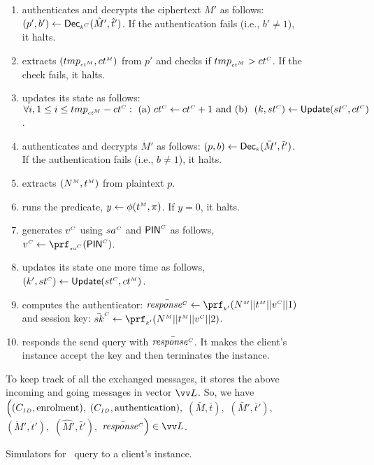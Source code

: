 \begin{figure}[H]
\begin{center}
\begin{tcolorbox}[enhanced,width=4.7in,left=0.1cm, 
    drop fuzzy shadow southwest,
    colframe=black,colback=white]
{{\begin{itemize}[leftmargin=.4cm]
\begin{itemize}[leftmargin=.4cm]
\begin{enumerate}
 \item   authenticates and decrypts the ciphertext $\hat M'$ as follows: $(p', b') \gets \mathsf{Dec}_{\scriptscriptstyle k^{\scriptscriptstyle C}}(\hat M', \hat t')$. If the authentication fails (i.e., $b'\neq 1$), it halts.  
  \item extracts $({tmp}_{\scriptscriptstyle{ct}^{\scriptscriptstyle M}}, {ct}^{\scriptscriptstyle M})$ from $p'$ and checks if ${tmp}_{\scriptscriptstyle{ct}^{\scriptscriptstyle M}} > {ct}^{\scriptscriptstyle C} $. If the check fails, it halts. 
 \item updates its state as follows: $\forall i, 1\leq i\leq {tmp}_{\scriptscriptstyle{ct}^{\scriptscriptstyle M}}- {ct}^{\scriptscriptstyle C}: \text{\ (a)\ } {ct}^{\scriptscriptstyle C} \gets {ct}^{\scriptscriptstyle C} + 1\text{\ and (b) \ } (k,  {st}^{\scriptscriptstyle C}) \gets \mathsf{Update}({st}^{\scriptscriptstyle C}, {ct}^{\scriptscriptstyle C})$. 
 \item  authenticates and decrypts $\ddot M'$ as follows: $(p, b) \gets \mathsf{Dec}_{\scriptscriptstyle k}(\ddot M', \ddot t')$. If the authentication fails (i.e., $b\neq 1$), it halts.
 \item    extracts $({N}^{\scriptscriptstyle M}, {t}^{\scriptscriptstyle M})$ from plaintext $p$.  
 \item runs the predicate, $y \leftarrow\phi({t}^{\scriptscriptstyle M}, \pi)$. If $y=0$, it halts. 
\item generates ${v}^{\scriptscriptstyle C}$ using ${sa}^{\scriptscriptstyle C}$ and $\mathsf{PIN}^{\scriptscriptstyle C}$ as follows, $\VC{\verifier} \gets \prf_{\sss\VC{\salt}}(\VC{\pin})$.
 \item updates its state one more time as follows, $(k',  {st}^{\scriptscriptstyle C}) \gets \mathsf{Update}({st}^{\scriptscriptstyle C}, {ct}^{\scriptscriptstyle M})$.
 \item computes  the authenticator: $\bar{\VC{\mathit{response}}} \gets \prf_{\sss k'}( \VM{\nonce} || \VM{\trans} || \VC{\verifier}|| 1)$ and session key:  $\bar {sk}^{\sss C} \gets \prf_{\sss k'}( \VM{\nonce} || \VM{\trans} || \VC{\verifier}|| 2)$.
 \item responds the send query with  $\bar{\mathit{response}^{\scriptscriptstyle C}}$. It makes the client's instance accept the key and then terminates the instance. 
 \end{enumerate}
 \end{itemize}
 \end{itemize}
}}
To keep track of all the exchanged messages, it stores the above incoming and going messages in vector $\vv L$. So, we have $\Big((C_{\scriptscriptstyle ID},  \text{enrolment}),$ $ (C_{\scriptscriptstyle ID},  \text{authentication}), $ $(\bar M, \bar t), $ $(\bar M', \bar t'),$ $(\ddot M', \ddot t'), $ $(\hat M', \hat t'), $ $\bar{\VC{\mathit{response}}}\Big)\in \vv L$.
\end{tcolorbox}
\end{center}
\vspace{-5mm}
\caption{Simulators for \send\ query to  a client's instance.} 
\label{fig::Send-sim-to-client}
\end{figure}



